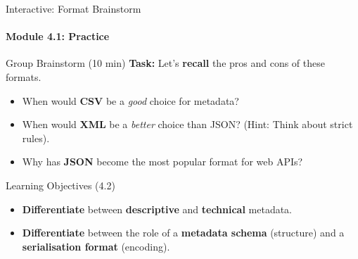 \begin{frame}{Interactive: Format Brainstorm}
    \framesubtitle{Module 4.1: Practice}
    \begin{block}{Group Brainstorm (10 min)}
        \textbf{Task:} Let's \textbf{recall} the pros and cons of these formats.
        \begin{itemize}
            \item When would \textbf{CSV} be a \textit{good} choice for metadata?
            \pause
            \item When would \textbf{XML} be a \textit{better} choice than JSON? (Hint: Think about strict rules).
            \pause
            \item Why has \textbf{JSON} become the most popular format for web APIs?
        \end{itemize}
    \end{block}
\end{frame}

\begin{frame}{Learning Objectives (4.2)}
    \begin{itemize}
        \item \textbf{Differentiate} between \textbf{descriptive} and \textbf{technical} metadata.
        \item \textbf{Differentiate} between the role of a \textbf{metadata schema} (structure) and a \textbf{serialisation format} (encoding).
    \end{itemize}
\end{frame}

